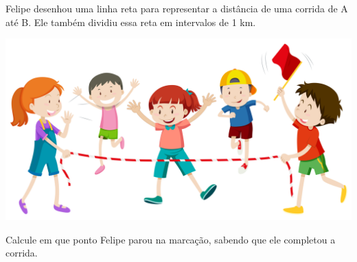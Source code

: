 \vspace{1em}

Felipe desenhou uma linha reta para representar a distância de uma corrida de A até B. Ele também dividiu essa reta em intervalos de 1 km. 

\includegraphics[width=\textwidth]{./media/image6a.jpeg}



\begin{escolha}
\item Calcule em que ponto Felipe parou na marcação, sabendo que ele completou a corrida.\\
\end{escolha}


